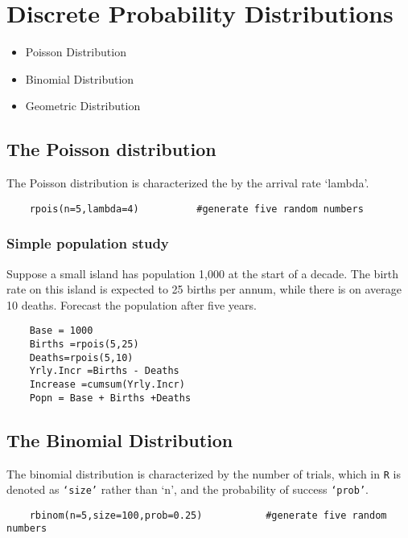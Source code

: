 \documentclass[a4paper,12pt]{article}
\begin{document}
\section{Discrete Probability Distributions}
\begin{itemize}
	\item Poisson Distribution
	\item Binomial Distribution
	\item Geometric Distribution
\end{itemize}
\subsection{The Poisson distribution}
The Poisson distribution is characterized the by the arrival rate ‘lambda’.
\begin{framed}
	\begin{verbatim}
	rpois(n=5,lambda=4)          #generate five random numbers
	\end{verbatim}
\end{framed} 
\subsubsection{Simple population study}

Suppose a small island has population 1,000 at the start of a decade. The birth rate on this island is expected to 25 births per annum, while there is on average 10 deaths.  Forecast the population after five years.

\begin{framed}
	\begin{verbatim}
	Base = 1000
	Births =rpois(5,25)
	Deaths=rpois(5,10)
	Yrly.Incr =Births - Deaths
	Increase =cumsum(Yrly.Incr)
	Popn = Base + Births +Deaths
	\end{verbatim}
\end{framed} 
\subsection{The Binomial Distribution}
The binomial distribution is characterized by the number of trials, which in \texttt{R} is denoted as \texttt{‘size’} rather than ‘n’, and the probability of success  \texttt{‘prob’}.
\begin{framed}
	\begin{verbatim}
	rbinom(n=5,size=100,prob=0.25)           #generate five random numbers
	\end{verbatim}
\end{framed} 
\newpage
\end{document}
